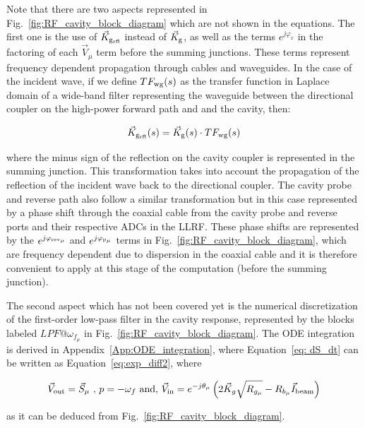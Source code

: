 \documentclass[a4paper,12pt]{article}
\begin{document}
Note that there are two aspects represented in Fig.~\ref{fig:RF_cavity_block_diagram} which are not shown in the equations. The first one is the use of $\vec K_{\rm g_{rfl}}$ instead of $\vec K_{\rm g}$, as well as the terms $e^{j\varphi_{x}}$ in the factoring of each $\vec V_\mu$ term before the summing junctions. These terms represent frequency dependent propagation through cables and waveguides. In the case of the incident wave, if we define $TF_{\rm wg}(s)$ as the transfer function in Laplace domain of a wide-band filter representing the waveguide between the directional coupler on the high-power forward path and and the cavity, then:

\begin{equation}
 \vec K_{\rm g_{rfl}}(s) = \vec K_{\rm g}(s) \cdot TF_{\rm wg}(s)
\end{equation}

\noindent where the minus sign of the reflection on the cavity coupler is represented in the summing junction. This transformation takes into account the propagation of the reflection of the incident wave back to the directional coupler.
The cavity probe and reverse path also follow a similar transformation but in this case represented by a phase shift through the coaxial cable from the cavity probe and reverse ports and their respective ADCs in the LLRF. These phase shifts are represented by the $e^{j\varphi_{\rm rev_{\mu}}}$ and $e^{j\varphi_{\rm p_{\mu}}}$ terms in Fig.~\ref{fig:RF_cavity_block_diagram}, which are frequency dependent due to dispersion in the coaxial cable and it is therefore convenient to apply at this stage of the computation (before the summing junction).

The second aspect which has not been covered yet is the numerical discretization of the first-order low-pass filter in the cavity response, represented by the blocks labeled $LPF@\omega_{f_{\mu}}$ in Fig.~\ref{fig:RF_cavity_block_diagram}. The ODE integration is derived in Appendix~\ref{App:ODE_integration}, where Equation~\ref{eq: dS_dt} can be written as Equation~\ref{eq:exp_diff2}, where

\begin{equation}
 \vec V_{\rm out} = \vec S_{\mu} \mbox{ , } p = -\omega_f \mbox{ and, } \vec V_{\rm in} = e^{-j\theta_{\mu}} \left(2\vec{K}_g\sqrt{R_{g_{\mu}}} - R_{b_{\mu}}\vec{I}_{\rm beam}\right)
\end{equation}

\noindent as it can be deduced from Fig.~\ref{fig:RF_cavity_block_diagram}. 
\end{document}
